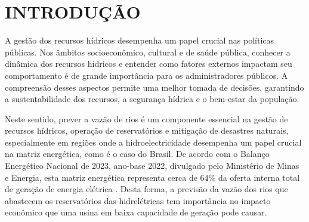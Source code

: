 \chapter{INTRODU\c{C}\~AO}  %



%


A gestão dos recursos hídricos desempenha um papel crucial nas políticas públicas. Nos âmbitos socioeconômico, cultural e de saúde pública, conhecer a dinâmica dos recursos hídricos e entender como fatores externos impactam seu comportamento é de grande importância para os administradores públicos. A compreensão desses aspectos permite uma melhor tomada de decisões, garantindo a sustentabilidade dos recursos, a segurança hídrica e o bem-estar da população.

Neste sentido, prever a vazão de rios é um componente essencial na gestão de recursos hídricos, operação de reservatórios e mitigação de desastres naturais, especialmente em regiões onde a hidroelectricidade desempenha um papel crucial na matriz energética, como é o caso do Brasil. De acordo com o Balanço Energético Nacional de 2023, ano-base 2022, divulgado pelo Ministério de Minas e Energia, esta matriz energética representa cerca de 64\% da oferta interna total de geração de energia elétrica \cite{epe2023ben}. Desta forma, a previsão da vazão dos rios que abastecem os reservatórios das hidrelétricas tem importância no impacto econômico que uma usina em baixa capacidade de geração pode causar.

